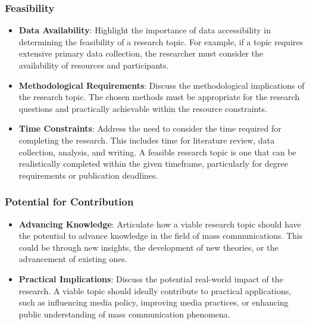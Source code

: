 \documentclass[
]{book}
\providecommand{\tightlist}{%
  \setlength{\itemsep}{0pt}\setlength{\parskip}{0pt}}
\begin{document}
\hypertarget{feasibility}{%
\subsubsection*{Feasibility}\label{feasibility}}

\begin{itemize}
\tightlist
\item
  \textbf{Data Availability}: Highlight the importance of data accessibility in determining the feasibility of a research topic. For example, if a topic requires extensive primary data collection, the researcher must consider the availability of resources and participants.
\item
  \textbf{Methodological Requirements}: Discuss the methodological implications of the research topic. The chosen methods must be appropriate for the research questions and practically achievable within the resource constraints.
\item
  \textbf{Time Constraints}: Address the need to consider the time required for completing the research. This includes time for literature review, data collection, analysis, and writing. A feasible research topic is one that can be realistically completed within the given timeframe, particularly for degree requirements or publication deadlines.
\end{itemize}

\hypertarget{potential-for-contribution}{%
\subsubsection*{Potential for Contribution}\label{potential-for-contribution}}

\begin{itemize}
\tightlist
\item
  \textbf{Advancing Knowledge}: Articulate how a viable research topic should have the potential to advance knowledge in the field of mass communications. This could be through new insights, the development of new theories, or the advancement of existing ones.
\item
  \textbf{Practical Implications}: Discuss the potential real-world impact of the research. A viable topic should ideally contribute to practical applications, such as influencing media policy, improving media practices, or enhancing public understanding of mass communication phenomena.
\end{itemize}
\end{document}
